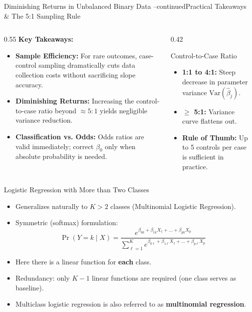 \documentclass[aspectratio=169, 11pt]{beamer}
\begin{document}
\begin{frame}{Diminishing Returns in Unbalanced Binary Data --continued}{Practical Takeaways \& The 5:1 Sampling Rule}
    \begin{columns}[T]
        \begin{column}{0.55\textwidth}
            \textbf{Key Takeaways:}
            \begin{itemize}
                \item \textbf{Sample Efficiency:} For rare outcomes, case-control sampling dramatically cuts data collection costs without sacrificing slope accuracy.
                \item \textbf{Diminishing Returns:} Increasing the control-to-case ratio beyond $\approx 5:1$ yields negligible variance reduction.
                \item \textbf{Classification vs. Odds:} Odds ratios are valid immediately; correct $\beta_0$ only when absolute probability is needed.
            \end{itemize}
        \end{column}

        \begin{column}{0.42\textwidth}
            \begin{block}{Control-to-Case Ratio}
                \begin{itemize}
                    \item \textbf{1:1 to 4:1:} Steep decrease in parameter variance $\text{Var}(\hat{\beta}_j)$.
                    \item \textbf{$\ge$ 5:1:} Variance curve flattens out.
                    \item \textbf{Rule of Thumb:} Up to 5 controls per case is sufficient in practice.
                \end{itemize}
            \end{block}
        \end{column}
    \end{columns}
\end{frame}

\begin{frame}{Logistic Regression with More than Two Classes}
  \begin{itemize}
    \item Generalizes naturally to $K > 2$ classes (Multinomial Logistic Regression).
    \item Symmetric (softmax) formulation:
    \[
      \Pr(Y = k \mid X) = \frac{e^{\beta_{0k} + \beta_{1k} X_1 + \dots + \beta_{pk} X_p}}{\sum_{\ell=1}^K e^{\beta_{0\ell} + \beta_{1\ell} X_1 + \dots + \beta_{p\ell} X_p}}
    \]
    \item Here there is a linear function for \textbf{each} class.
    \item Redundancy: only $K - 1$ linear functions are required (one class serves as baseline).
    \item Multiclass logistic regression is also referred to as \textbf{multinomial regression}.
  \end{itemize}
\end{frame}
\end{document}
